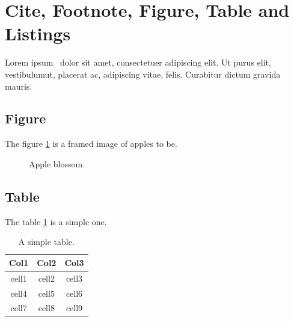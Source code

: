 \section{Cite, Footnote, Figure, Table and Listings}

Lorem ipsum~\cite{loremlipsum} dolor sit amet, consectetuer adipiscing elit. Ut purus elit, vestibulumut, placerat ac, adipiscing vitae, felis. Curabitur dictum gravida mauris. 

\subsection{Figure}

The figure \ref{fig:appleblossom1} is a framed image of apples to be.

\begin{figure}[ht!]
    \caption{Apple blossom.}
    \label{fig:appleblossom1}
\end{figure}

\subsection{Table}

The table \ref{table:simpletable} is a simple one.

\begin{table}[ht!]
    \begin{tabular}{ |c|c|c| } 
        \hline
        Col1 & Col2 & Col3 \\
        \hline
        cell1 & cell2 & cell3 \\ 
        cell4 & cell5 & cell6 \\ 
        cell7 & cell8 & cell9 \\ 
        \hline
    \end{tabular}
    \caption{A simple table.}
    \label{table:simpletable}
\end{table}

